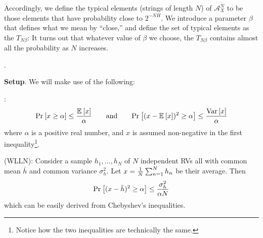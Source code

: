 \documentclass[11pt]{article}
\begin{document}
Accordingly, we define the typical elements (strings of length $N$) of $\mathcal{A}_X^N$ to be those elements that have probability close to $2^{-NH}$. We introduce a parameter $\beta$ that defines what we mean by ``close,'' and define the set of typical elements as the  $T_{N\beta}$:
It turns out that whatever value of $\beta$ we choose, the $T_{N\beta}$ contains almost all the probability as $N$ increases.



\myspace
{}
\myspace

\myspace
\p {}.
\begin{compactitem}
	\item \textbf{Setup}. We will make use of the following:
	\begin{compactitem}
		\item {}:
		\begin{align}
		\text{Pr}_{}\left[x \ge \alpha\right] \le \frac{  \mathbb{E}_{}\left[x\right]   }{  \alpha  }
		\qquad \text{and} \qquad
		\text{Pr}_{}\left[ (x - \mathbb{E}_{}\left[x\right])^2 \ge \alpha \right] \le \frac{\mathrm{Var}\left[x\right]}{\alpha}
		\end{align}
		where $\alpha$ is a positive real number, and $x$ is assumed non-negative in the first inequality\footnote{Notice how the two inequalities are technically the same.}.
		
		
		\item {} (WLLN): Consider a sample $h_1, \ldots, h_N$ of $N$ independent RVs all with common mean $\bar h$ and common variance $\sigma_h^2$. Let $x = \frac{1}{N}\sum_{n=1}^{N} h_n$ be their average. Then
		\begin{align}
			\text{Pr}_{}\left[ (x - \bar h)^2 \ge \alpha \right] \le \frac{\sigma_h^2}{\alpha N}
		\end{align}
		which can be easily derived from Chebyshev's inequalities.
	\end{compactitem}
	

\end{compactitem}
\end{document}
